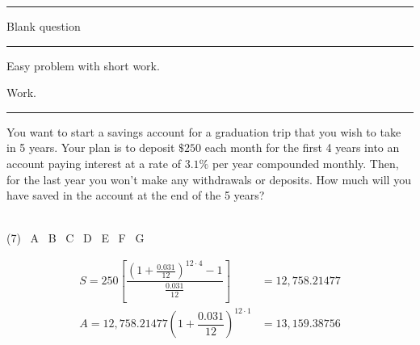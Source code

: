\noindent\rule{\textwidth}{1pt}

\begin{question}[class=Z]{3}
   Blank question
\end{question}

\noindent\rule{\textwidth}{1pt}

\begin{question}[class=Z]{3}
  \label{question:easy-problem}
  Easy problem with short work.
\end{question}
\begin{minipage}{0.70\textwidth}
  \begin{solution}
    Work.
  \end{solution}
\end{minipage}\hspace{\fill}%
\begin{minipage}{0.25\textwidth}
  \vspace{0.1in}
\end{minipage}

\noindent\rule{\textwidth}{1pt}

\begin{question}[class=Z]{6}
  \label{question:formula-problem}
  You want to start a savings account for a graduation trip that you wish to take in 5 years.
  Your plan is to deposit \(\$ 250\) each month for the first 4 years into an account paying interest at a rate of \(3.1\%\) per year compounded monthly.
  Then, for the last year you won't make any withdrawals or deposits.
  How much will you have saved in the account at the end of the 5 years?\\
  \FormulaInstructions~\RoundUnitsInstructions
  \begin{tasks}(7)
    \task[\selectall] \ A
    \task[\selectall] \ B
    \task[\correctselectall] \ C
    \task[\selectall] \ D
    \task[\selectall] \ E
    \task[\correctselectall] \ F
    \task[\selectall] \ G
  \end{tasks}
\end{question}
\begin{minipage}{0.70\textwidth}
  \begin{solution}
    \begin{align*}
      S = 250 \left[ \dfrac{\left(1 + \frac{0.031}{12} \right)^{12\cdot4} - 1}{\frac{0.031}{12}} \right] &= 12,758.21477 \\
      A = 12,758.21477 \left( 1 + \dfrac{0.031}{12} \right)^{12\cdot1} &= 13,159.38756
    \end{align*}
  \end{solution}
\end{minipage}\hspace{\fill}%
\begin{minipage}{0.25\textwidth}
  \vspace{1.5in}
  \vspace{0.1in}
\end{minipage}


